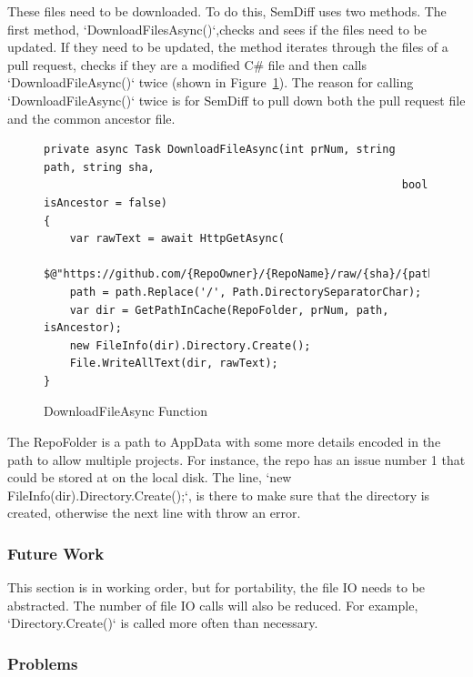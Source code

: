 \documentclass[draftclsnofoot,onecolumn]{IEEEtran}
\begin{document}
These files need to be downloaded. To do this, SemDiff uses two methods. The 
first method, `DownloadFilesAsync()`,checks and sees if the files need to be 
updated. If they need to be updated, the method iterates through the files of 
a pull request, checks if they are a modified C\# file and then calls 
`DownloadFileAsync()` twice (shown in Figure~\ref{DownloadFileAsync}). The 
reason for calling `DownloadFileAsync()` twice is for SemDiff to pull down 
both the pull request file and the common ancestor file. 

\begin{figure}[!t]
\centering
\begin{lstlisting}
private async Task DownloadFileAsync(int prNum, string path, string sha, 
                                                       bool isAncestor = false)
{
    var rawText = await HttpGetAsync(
	           $@"https://github.com/{RepoOwner}/{RepoName}/raw/{sha}/{path}");
    path = path.Replace('/', Path.DirectorySeparatorChar);
    var dir = GetPathInCache(RepoFolder, prNum, path, isAncestor);
    new FileInfo(dir).Directory.Create();
    File.WriteAllText(dir, rawText);
}
\end{lstlisting}
\caption{DownloadFileAsync Function}
\label{DownloadFileAsync}
\end{figure}

The RepoFolder is a path to AppData with some more details encoded in the path 
to allow multiple projects. For instance, the repo  has an issue number 1 that could be stored 
at \texit{\url{C:\\Users\[Username]\AppData\Roaming\SemDiff\semdiffdotnet
\curly-broccoli\1}} on the local disk. The line, 
`new FileInfo(dir).Directory.Create();`, is there to make sure that the 
directory is created, otherwise the next line with throw an error.

\subsubsection{Future Work}

This section is in working order, but for portability, the file IO needs to be 
abstracted. The number of file IO calls will also be reduced. For example, 
`Directory.Create()` is called more often than necessary.

\subsubsection{Problems}
\end{document}
